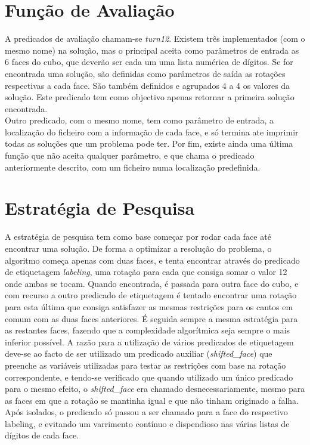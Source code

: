 \section{Função de Avaliação}
\label{restr:3}

A predicados de avaliação chamam-se \textit{turn12}. Existem três implementados (com o mesmo nome) na solução, mas o principal aceita como parâmetros de entrada as 6 faces do cubo, que deverão ser cada um uma lista numérica de dígitos. Se for encontrada uma solução, são definidas como parâmetros de saída as rotações respectivas a cada face. São também definidos e agrupados 4 a 4 os valores da solução. Este predicado tem como objectivo apenas retornar a primeira solução encontrada.\\
Outro predicado, com o mesmo nome, tem como parâmetro de entrada, a localização do ficheiro com a informação de cada face, e só termina ate imprimir todas as soluções que um problema pode ter.
Por fim, existe ainda uma última função que não aceita qualquer parâmetro, e que chama o predicado anteriormente descrito, com um ficheiro numa localização predefinida.


\section{Estratégia de Pesquisa}
\label{rest:4}

A estratégia de pesquisa tem como base começar por rodar cada face até encontrar uma solução.
De forma a optimizar a resolução do problema, o algoritmo começa apenas com duas faces, e tenta encontrar através do predicado de etiquetagem \textit{labeling}, uma rotação para cada que consiga somar o valor 12 onde ambas se tocam.
Quando encontrada, é passada para outra face do cubo, e com recurso a outro predicado de etiquetagem é tentado encontrar uma rotação para esta última que consiga satisfazer as mesmas restrições para os cantos em comum com as duas faces anteriores. É seguida sempre a mesma estratégia para as restantes faces, fazendo que a complexidade algorítmica seja sempre o mais inferior possível.
A razão para a utilização de vários predicados de etiquetagem deve-se ao facto de ser utilizado um predicado auxiliar (\textit{shifted\_face}) que preenche as variáveis utilizadas para testar as restrições com base na rotação correspondente, e tendo-se verificado que quando utilizado um único predicado para o mesmo efeito, o \textit{shifted\_face} era chamado desnecessariamente, mesmo para as faces em que a rotação se mantinha igual e que não tinham originado a falha.
Após isolados, o predicado só passou a ser chamado para a face do respectivo labeling, e evitando um varrimento contínuo e dispendioso nas várias listas de dígitos de cada face.

